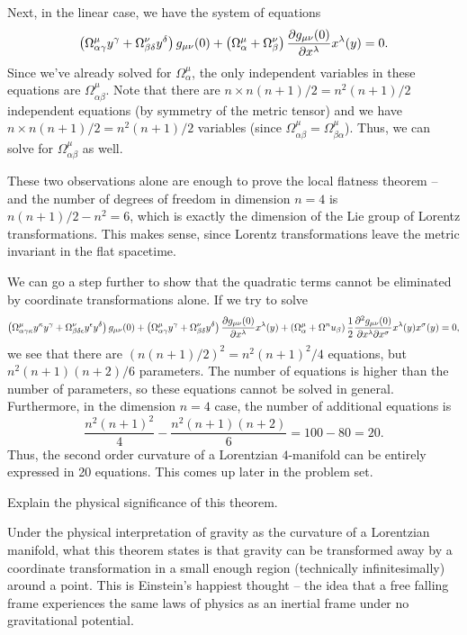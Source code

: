 \documentclass{../../templates/lkx_pset}
\begin{document}
\begin{solution}
	Next, in the linear case, we have the system of equations
	\[
		\left(\Omega^\mu_{\alpha\gamma}y^\gamma + \Omega^\nu_{\beta\delta} y^\delta\right) g_{\mu\nu}(0) + \left(
		\Omega^\mu_\alpha + \Omega^\nu_\beta
		\right) \frac{\partial g_{\mu\nu}(0)}{\partial x^\lambda} x^\lambda(y)
		= 0.
	\]
	Since we've already solved for $\Omega^\mu_\alpha$, the only independent variables in these equations are $\Omega^\mu_{\alpha\beta}$. Note that there are $n\times n(n+1)/2= n^2(n+1)/2$ independent equations (by symmetry of the metric tensor) and we have $n\times n(n+1)/2 = n^2(n+1)/2$ variables (since $\Omega^\mu_{\alpha\beta} = \Omega^\mu_{\beta\alpha}$). Thus, we can solve for $\Omega^\mu_{\alpha\beta}$ as well.

	These two observations alone are enough to prove the local flatness theorem -- and the number of degrees of freedom in dimension $n=4$ is $n(n+1)/2 - n^2=6$, which is exactly the dimension of the Lie group of Lorentz transformations. This makes sense, since Lorentz transformations leave the metric invariant in the flat spacetime.

	We can go a step further to show that the quadratic terms cannot be eliminated by coordinate transformations alone. If we try to solve
	\[
		\left(\Omega^\mu_{\alpha\gamma\kappa}y^{\kappa}y^{\gamma} + \Omega^\nu_{\beta\delta\epsilon}y^{\epsilon}y^{\delta}\right)g_{\mu\nu}(0) + \left(\Omega^\mu_{\alpha\gamma}y^\gamma + \Omega^\nu_{\beta\delta}y^{\delta}\right)\frac{\partial g_{\mu\nu}(0)}{\partial x^\lambda} x^\lambda(y) + \left(\Omega^\mu_\alpha + \Omega^nu_\beta\right)\frac{1}{2}\frac{\partial^2 g_{\mu\nu}(0)}{\partial x^{\lambda} \partial x^{\sigma}} x^\lambda(y)x^{\sigma}(y) = 0,
	\]
	we see that there are $(n(n+1)/2)^2 = n^2(n+1)^2/4$ equations, but $n^2(n+1)(n+2)/6$ parameters. The number of equations is higher than the number of parameters, so these equations cannot be solved in general. Furthermore, in the dimension $n=4$ case, the number of additional equations is
	\[
		\frac{n^2(n+1)^2}{4} - \frac{n^2(n+1)(n+2)}{6} = 100 - 80 = 20.
	\]
	Thus, the second order curvature of a Lorentzian $4$-manifold can be entirely expressed in 20 equations. This comes up later in the problem set.

	\begin{part}{}Explain the physical significance of this theorem.
	\end{part}

	Under the physical interpretation of gravity as the curvature of a Lorentzian manifold, what this theorem states is that gravity can be transformed away by a coordinate transformation in a small enough region (technically infinitesimally) around a point. This is Einstein's happiest thought -- the idea that a free falling frame experiences the same laws of physics as an inertial frame under no gravitational potential.
\end{solution}
\end{document}
